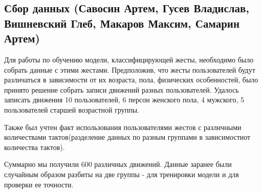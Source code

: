 \subsection{Сбор данных (Савосин Артем, Гусев Владислав, Вишневский Глеб, Макаров Максим, Самарин Артем)}
Для работы по обучению модели, классифицирующей жесты, необходимо было собрать данные с этими жестами. Предположив, что жесты пользователей будут различаться в зависимости от их возраста, пола, физических особенностей, было принято решение собрать записи движений разных пользователей. Удалось записать движения 10 пользователей, 6 персон женского пола, 4 мужского, 5 пользователей старшей возрастной группы.

Также был учтен факт использования пользователями жестов с различными количествами тактов(разделение данных по разным группами в зависимостиот количества тактов).

Суммарно мы получили 600 различных движений.
Данные заранее были случайным образом разбиты на две группы - для тренировки модели и для проверки ее точности.

\begin{figure}[H]
\end{figure}
